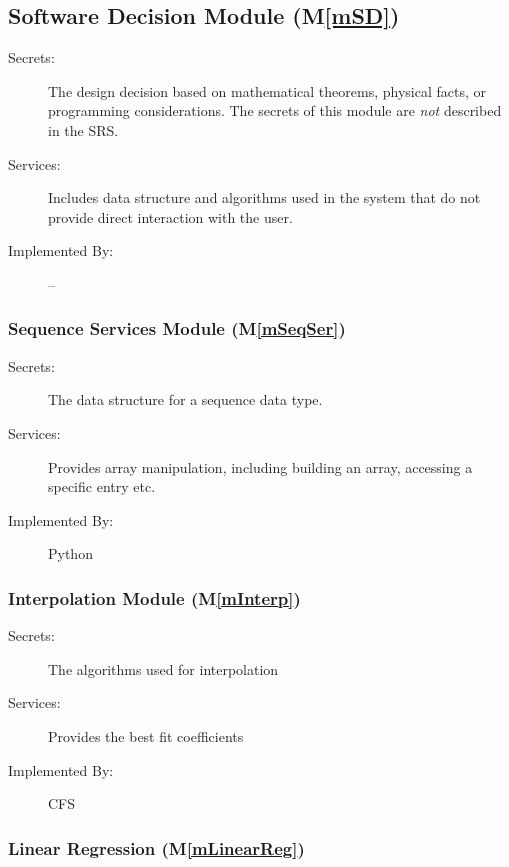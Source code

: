 \documentclass[12pt, titlepage]{article}
\newcommand{\mref}[1]{M\ref{#1}}
\newcommand{\famname}{CFS} %
\begin{document}
\subsection{Software Decision Module (\mref{mSD})}

\begin{description}
\item[Secrets:] The design decision based on mathematical theorems, physical
  facts, or programming considerations. The secrets of this module are
  \emph{not} described in the SRS.
\item[Services:] Includes data structure and algorithms used in the system that
  do not provide direct interaction with the user. 
\item[Implemented By:] --
\end{description}


\subsubsection{Sequence Services Module  (\mref{mSeqSer})}

\begin{description}
	\item[Secrets:] The data structure for a sequence data type.
	\item[Services:] Provides array manipulation, including building an array,
	accessing a specific entry etc.
	\item[Implemented By:] Python
\end{description} 



\subsubsection{Interpolation Module (\mref{mInterp})}

\begin{description}
	\item[Secrets:] The algorithms used for interpolation
	\item[Services:] Provides the best fit coefficients
	\item[Implemented By:] \famname{}
\end{description}

\subsubsection{Linear Regression (\mref{mLinearReg})}
\end{document}
